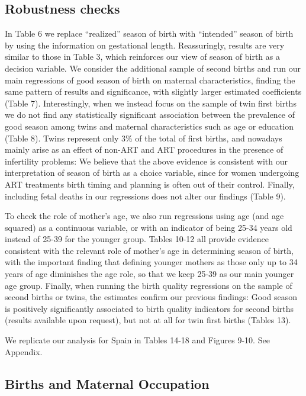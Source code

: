 \documentclass[a4paper, 12 pt]{article}
\theoremstyle{plain}
\begin{document}
\begin{doublespace}
\subsection{Robustness checks}
In Table 6 we replace ``realized'' season of birth with ``intended'' season of birth by using the information on gestational length. Reassuringly, results are very similar to those in Table 3, which reinforces our view of season of birth as a decision variable. We consider the additional sample of second births and run our main regressions of good season of birth on maternal characteristics, finding the same pattern of results and significance, with slightly larger estimated coefficients (Table 7). Interestingly, when we instead focus on the sample of twin first births we do not find any statistically significant association between the prevalence of good season among twins and maternal characteristics such as age or education (Table 8). Twins represent only 3\% of the total of first births, and nowadays mainly arise as an effect of non-ART and ART procedures in the presence of infertility problems: We believe that the above evidence is consistent with our interpretation of season of birth as a choice variable, since for women undergoing ART treatments birth timing and planning is often out of their control. Finally, including fetal deaths in our regressions does not alter our findings (Table 9).

To check the role of mother's age, we also run regressions using age (and age squared) as a continuous variable, or with an indicator of being 25-34 years old instead of 25-39 for the younger group. Tables 10-12 all provide evidence consistent with the relevant role of mother's age in determining season of birth, with the important finding that defining younger mothers as those only up to 34 years of age diminishes the age role, so that we keep 25-39 as our main younger age group. Finally, when running the birth quality regressions on the sample of second births or twins, the estimates confirm our previous findings: Good season is positively significantly associated to birth quality indicators for second births (results available upon request), but not at all for twin first births (Tables 13).

We replicate our analysis for Spain in Tables 14-18 and Figures 9-10. See Appendix.

\subsection{Births and Maternal Occupation}



\end{doublespace}
\end{document}
